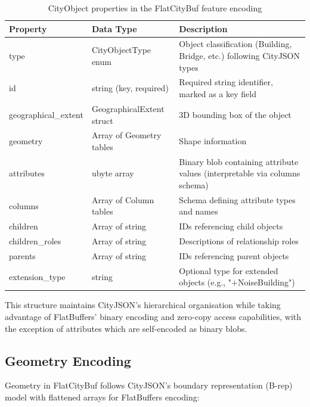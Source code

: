 \begin{itemize}
    \begin{table}[h]
      \centering
      \caption{CityObject properties in the FlatCityBuf feature encoding}
      \label{tab:cityobject_properties}
      \small
      \begin{tabularx}{\textwidth}{@{}llX@{}}
        \toprule
        \textbf{Property} & \textbf{Data Type} & \textbf{Description} \\
        \midrule
        type & CityObjectType enum & Object classification (Building, Bridge, etc.) following CityJSON types \\
        id & string (key, required) & Required string identifier, marked as a key field \\
        geographical\_extent & GeographicalExtent struct & 3D bounding box of the object \\
        geometry & Array of Geometry tables & Shape information \\
        attributes & ubyte array & Binary blob containing attribute values (interpretable via columns schema) \\
        columns & Array of Column tables & Schema defining attribute types and names \\
        children & Array of string & IDs referencing child objects \\
        children\_roles & Array of string & Descriptions of relationship roles \\
        parents & Array of string & IDs referencing parent objects \\
        extension\_type & string & Optional type for extended objects (e.g., "+NoiseBuilding") \\
        \bottomrule
      \end{tabularx}
    \end{table}
\end{itemize}

This structure maintains CityJSON's hierarchical organisation while taking advantage of FlatBuffers' binary encoding and zero-copy access capabilities, with the exception of attributes which are self-encoded as binary blobs.

\subsection{Geometry Encoding}
\label{methodology:feature_encoding:geometry_encoding}

Geometry in FlatCityBuf follows CityJSON's boundary representation (B-rep) model with flattened arrays for FlatBuffers encoding:

